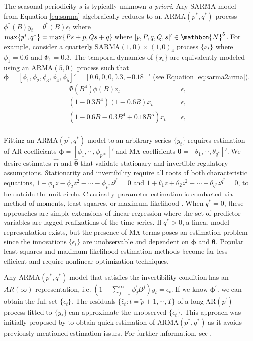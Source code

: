 The seasonal periodicity $s$ is typically unknown \textit{a priori}. Any SARMA model from Equation \ref{eq:sarma} algebraically reduces to an ARMA$(p^*,q^*)$ process $\phi^*(B)y_t=\theta^*(B)\epsilon_t$ where $\max\{p^*,q^*\}=\max\{Ps+p,Qs+q\} \textrm{ where } [p,P,q,Q,s]'\in\mathbbm{N}^5$. For example, consider a quarterly SARMA$(1,0)\times(1,0)_{4}$ process $\{x_t\}$ where $\phi_1=0.6$ and $\Phi_1=0.3$. The temporal dynamics of $\{x_t\}$ are equivalently modeled using an ARMA$(5,0)$ process such that $\bm{\phi}=[\phi_1,\phi_2,\phi_3,\phi_4,\phi_5]'=[0.6,0,0,0.3,-0.18]'$ (see Equation \ref{eq:sarma2arma}).
\begin{equation}
\label{eq:sarma2arma}
\begin{split}
\Phi(B^4)\phi(B)x_t&=\epsilon_t\\
(1-0.3B^4)(1-0.6B)x_t&=\epsilon_t\\
(1-0.6B-0.3B^4+0.18B^5)x_t&=\epsilon_t\\
\end{split}
\end{equation}

Fitting an ARMA$(p^*,q^*)$ model to an arbitrary series $\{y_t\}$ requires estimation of AR coefficients $\bm{\phi}=[\phi_1,\cdots,\phi_{p*}]'$ and MA coefficients $\bm{\theta}=[\theta_1,\cdots,\theta_{q^*}]'$. We desire estimates $\hat{\bm{\phi} }$ and $\hat{\bm{\theta} }$ that validate stationary and invertible regulatory assumptions. Stationarity and invertibility require all roots of both characteristic equations, $1-\phi_1z-\phi_2z^2-\cdots -\phi_{p^*}z^{p^*}=0$ and $1+\theta_1z+\theta_2z^2+\cdots +\theta_{q^*}z^{q^*}=0$, to be outside the unit circle. Classically, parameter estimation is conducted via method of moments, least squares, or maximum likelihood \citep{Hamilton1994, Cryer2008}. When $q^*=0$, these approaches are simple extensions of linear regression where the set of predictor variables are lagged realizations of the time series. If $q^*>0$, a linear model representation exists, but the presence of MA terms poses an estimation problem since the innovations $\{\epsilon_t\}$ are unobservable and dependent on $\bm{\phi}$ and $\bm{\theta}$. Popular least squares and maximum likelihood estimation methods become far less efficient and require nonlinear optimization techniques.

Any ARMA$(p^*,q^*)$ model that satisfies the invertibility condition has an $AR(\infty)$ representation, i.e. $(1-\sum\limits_{j=1}^\infty \phi^\prime_jB^j)y_t=\epsilon_t$. If we know $\bm{\phi}^\prime$, we can obtain the full set $\{\epsilon_t\}$. The residuals $\{\hat{\epsilon}_t: t=\tilde{p}+1,\cdots,T\}$ of a long AR$(p^\prime)$ process fitted to  $\{y_t\}$ can approximate the unobserved $\{\epsilon_t\}$.  This approach was initially proposed by \cite{Hannan1982} to obtain quick estimation of ARMA$(p^*,q^*)$ as it avoids previously mentioned estimation issues. For further information, see \citet[pp. 156-158]{Brockwell2016}.

